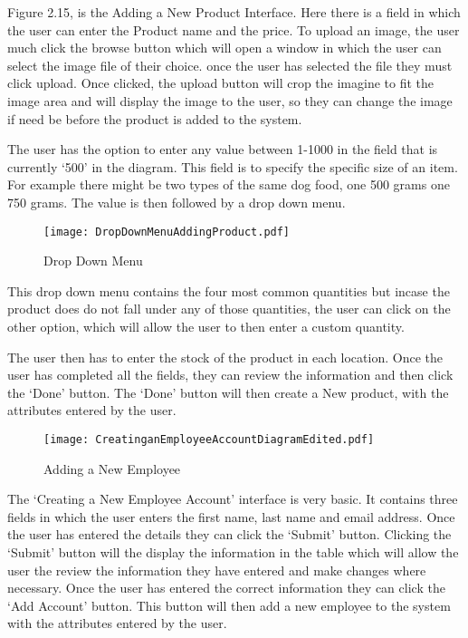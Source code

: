 Figure 2.15, is the Adding a New Product Interface. Here there is a field in which the user can enter the Product name and the price. To upload an image, the user much click the browse button which will open a window in which the user can select the image file of their choice. once the user has selected the file they must click upload. Once clicked, the upload button will crop the imagine to fit the image area and will display the image to the user, so they can change the image if need be before the product is added to the system. \par

The user has the option to enter any value between 1-1000 in the field that is currently `500' in the diagram.  This field is to specify the specific size of an item. For example there might be two types of the same dog food, one 500 grams one 750 grams. The value is then followed by a drop down menu. \par


\begin{figure}[H]
\caption{Drop Down Menu} \label{fig:Drop Down Menu}
\hfill\texttt{[image: DropDownMenuAddingProduct.pdf]}\hspace*{\fill}
\end{figure}

This drop down menu contains the four most common quantities but incase the product does do not fall under any of those quantities, the user can click on the other option, which will allow the user to then enter a custom quantity. \par

The user then has to enter the stock of the product in each location. Once the user has completed all the fields, they can review the information and then click the `Done' button. The `Done' button will then create a New product, with the attributes entered by the user. \par

\begin{figure}[H]
\caption{Adding a New Employee} \label{fig:Adding a New Employee Interface}
\hfill\texttt{[image: CreatinganEmployeeAccountDiagramEdited.pdf]}\hspace*{\fill}
\end{figure}

The `Creating a New Employee Account' interface is very basic. It contains three fields in which the user enters the first name, last name and email address. Once the user has entered the details they can click the `Submit' button. Clicking the `Submit' button will the display the information in the table which will allow the user the review the information they have entered and make changes where necessary. Once the user has entered the correct information they can click the `Add Account' button. This button will then add a new employee to the system with the attributes entered by the user. \par

